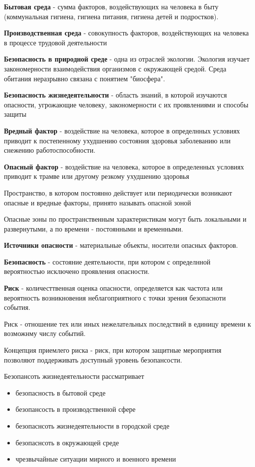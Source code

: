 \documentclass{article}
\begin{document}
\textbf{Бытовая среда} - сумма факторов, воздействующих на человека в быту (коммунальная
гигиена, гигиена питания, гигиена детей и подростков).

\textbf{Производственная среда} - совокупность факторов, воздействующих на человека в
процессе трудовой деятельности

\textbf{Безопасность в природной среде} - одна из отраслей экологии. Экология изучает
закономерности взаимодействия организмов с окружающей средой. Среда обитания
неразрывно связана с понятием "биосфера".

\textbf{Безопасность жизнедеятельности} - область знаний, в которой изучаются опасности, угрожающие человеку, закономерности с их проявлениями и способы защиты 

\textbf{Вредный фактор} - воздействие на человека, которое в определнных условиях приводит к постепенному ухудшению состояния здоровья заболеванию или снежению работоспособности.

\textbf{Опасный фактор} - воздействие на человека, которое в определенных условиях приводит к трамве или другому резкому ухудшению здоровья

Пространство, в котором постоянно действует или периодически возникают опасные и вредные факторы, принято называть опасной зоной

Опасные зоны по пространственным характеристикам могут быть локальными и развернутыми, а по времени - постоянными и временными.

\textbf{Источники опасности} - материальные объекты, носители опасных факторов.

\textbf{Безопасность} - состояние деятельности, при котором с определнной вероятностью исключено проявления опасности.

\textbf{Риск} - количесттвенная оценка опасности, определяется как частота или вероятность возникновения неблагоприятного с точки зрения безопасноти события.

Риск - отношение тех или иных нежелательных последствий в единицу времени к возможнму числу событий.

Концепция приемлего риска - риск, при котором защитные мероприятия позволяют поддерживать доступный уровень безопансости.



Безопансоть жизнедеятельности рассматривает

\begin{itemize}
    \item безопасность в бытовой среде
    \item безопансость в производственной сфере
    \item безопаснсоть жизнедеятельности в городской среде
    \item безопаснсоть в окружающей среде
    \item чрезвычайные ситуации мирного и военного времени
\end{itemize}
\end{document}
